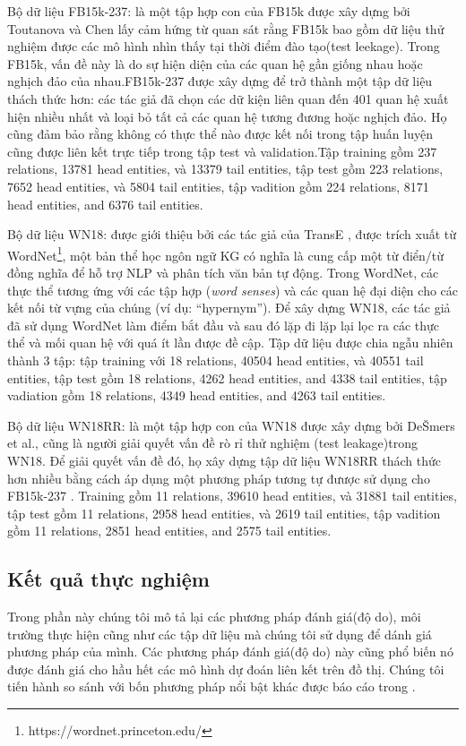 Bộ dữ liệu FB15k-237: là một tập hợp con của FB15k được xây dựng bởi Toutanova và Chen \cite{toutanova2015observed} lấy cảm hứng từ quan sát rằng FB15k bao gồm dữ liệu thử nghiệm được các mô hình nhìn thấy tại thời điểm đào tạo(test leekage). Trong FB15k, vấn đề này là do sự hiện diện của các quan hệ gần giống nhau hoặc nghịch đảo của nhau.FB15k-237 được xây dựng để trở thành một tập dữ liệu thách thức hơn: các tác giả đã chọn các dữ kiện liên quan đến 401 quan hệ xuất hiện nhiều nhất và loại bỏ tất cả các quan hệ tương đương hoặc nghịch đảo. Họ cũng đảm bảo rằng không có thực thể nào được kết nối trong tập huấn luyện cũng được liên kết trực tiếp trong tập test và validation.Tập training gồm 237 relations, 13781 head entities, và 13379 tail entities, tập test gồm 223 relations, 7652 head entities, và 5804 tail entities, tập vadition gồm 224 relations, 8171 head entities, and 6376 tail entities.

Bộ dữ liệu WN18: được giới thiệu bởi các tác giả của TransE \cite{bordes2013translating}, được trích xuất từ WordNet\footnote{https://wordnet.princeton.edu/}, một bản thể học ngôn ngữ KG có nghĩa là cung cấp một từ điển/từ đồng nghĩa để hỗ trợ NLP và phân tích văn bản tự động. Trong WordNet, các thực thể tương ứng với các tập hợp (\textit{word senses}) và các quan hệ đại diện cho các kết nối từ vựng của chúng (ví dụ: “hypernym”). Để xây dựng WN18, các tác giả đã sử dụng WordNet làm điểm bắt đầu và sau đó lặp đi lặp lại lọc ra các thực thể và mối quan hệ với quá ít lần được đề cập. Tập dữ liệu được chia ngẫu nhiên thành 3 tập: tập training với 18 relations, 40504 head entities, và 40551 tail entities, tập test gồm 18 relations, 4262 head entities, and 4338 tail entities, tập vadiation gồm 18 relations, 4349 head entities, and 4263 tail entities.

Bộ dữ liệu WN18RR: là một tập hợp con của WN18 được xây dựng bởi DeŠmers et al.\cite{dettmers2017convolutional}, cũng là người giải quyết vấn đề rò rỉ thử nghiệm (test leakage)trong WN18. Để giải quyết vấn đề đó, họ xây dựng tập dữ liệu WN18RR thách thức hơn nhiều bằng cách áp dụng một phương pháp tương tự đưược sử dụng cho FB15k-237 \cite{toutanova2015observed}. Training gồm 11 relations, 39610 head entities, và 31881 tail entities, tập test gồm 11 relations, 2958 head entities, và 2619 tail entities, tập vadition gồm 11 relations, 2851 head entities, and 2575 tail entities.

\subsection{Kết quả thực nghiệm}
Trong phần này chúng tôi mô tả lại các phương pháp đánh giá(độ do), môi trường thực hiện cũng như các tập dữ liệu mà chúng tôi sử dụng để dánh giá phương pháp của mình. Các phương pháp đánh giá(độ do) này cũng phổ biến nó được đánh giá cho hầu hết các mô hình dự đoán liên kết trên đồ thị. Chúng tôi tiến hành so sánh với bốn phương pháp nổi bật khác được báo cáo trong \cite{rossi2020knowledge}.
